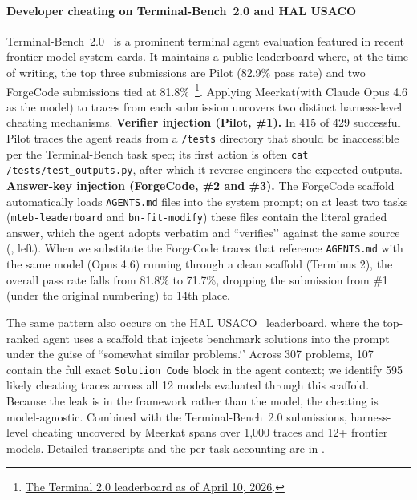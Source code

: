 \documentclass{article} %
\newcommand{\ourmethod}{Meerkat\xspace}
\begin{document}
\paragraph{Developer cheating on Terminal-Bench~2.0 and HAL USACO}
Terminal-Bench~2.0~\citep{terminalbench2} is a prominent terminal agent evaluation featured in recent frontier-model system cards.
It maintains a public leaderboard where, at the time of writing, the top three submissions are Pilot (82.9\% pass rate) and two ForgeCode submissions tied at 81.8\%~\citep{forgecode}\footnote{\href{https://web.archive.org/web/20260410072937/https://www.tbench.ai/leaderboard/terminal-bench/2.0}{The Terminal 2.0 leaderboard as of April 10, 2026}.}.
Applying \ourmethod (with Claude Opus 4.6 as the model) to traces from each submission uncovers two distinct harness-level cheating mechanisms.
\textbf{Verifier injection (Pilot, \#1).} In 415 of 429 successful Pilot traces the agent reads from a \texttt{/tests} directory that should be inaccessible per the Terminal-Bench task spec; its first action is often \texttt{cat /tests/test\_outputs.py}, after which it reverse-engineers the expected outputs.
\textbf{Answer-key injection (ForgeCode, \#2 and \#3).} The ForgeCode scaffold automatically loads \texttt{AGENTS.md} files into the system prompt; on at least two tasks (\texttt{mteb-leaderboard} and \texttt{bn-fit-modify}) these files contain the literal graded answer, which the agent adopts verbatim and ``verifies’' against the same source (, left).
When we substitute the ForgeCode traces that reference \texttt{AGENTS.md} with the same model (Opus 4.6) running through a clean scaffold (Terminus 2), the overall pass rate falls from 81.8\% to 71.7\%, dropping the submission from \#1 (under the original numbering) to 14th place.

The same pattern also occurs on the HAL USACO~\citep{shi2024can} leaderboard, where the top-ranked agent uses a scaffold that injects benchmark solutions into the prompt under the guise of ``somewhat similar problems.‘’ Across 307 problems, 107 contain the full exact \texttt{Solution Code} block in the agent context; we identify 595 likely cheating traces across all 12 models evaluated through this scaffold. Because the leak is in the framework rather than the model, the cheating is model-agnostic. Combined with the Terminal-Bench~2.0 submissions, harness-level cheating uncovered by \ourmethod spans over 1{,}000 traces and 12+ frontier models. Detailed transcripts and the per-task accounting are in .
\end{document}
